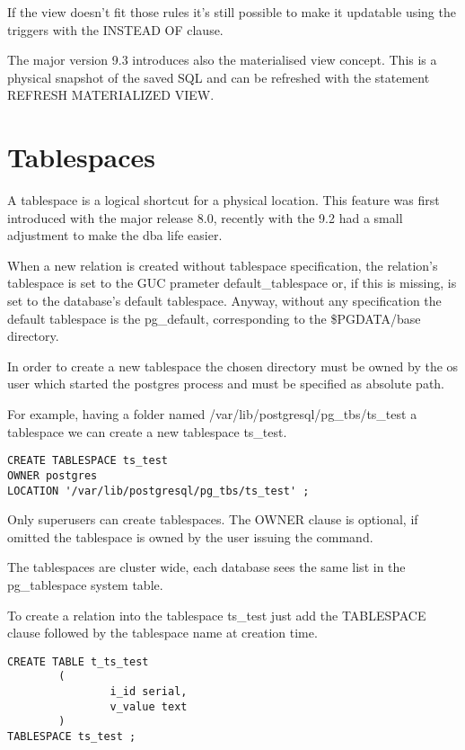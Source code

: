 If the view doesn't fit those rules it's still possible to make it updatable 
using the triggers with the INSTEAD OF clause.

The major version 9.3 introduces also the materialised view concept. This is a 
physical snapshot of the saved SQL and can be refreshed with the statement 
REFRESH MATERIALIZED VIEW.  


\section{Tablespaces}
\label{sub:TBS-LOGICAL}
A tablespace is a logical shortcut for a physical location. 
This feature was first introduced with the major release 8.0, recently with the 
9.2 had a small adjustment to make the dba life easier.

When a new relation is created without tablespace specification, the relation's
tablespace is set to the GUC prameter default\_tablespace or, if this is 
missing, is set to the database's default tablespace. 
Anyway, without any specification the default tablespace is the pg\_default, 
corresponding to the \$PGDATA/base directory.

In order to create a new tablespace the chosen directory must be owned by 
the os user which started the postgres process and must be specified as 
absolute path. 

For example, having a folder named /var/lib/postgresql/pg\_tbs/ts\_test a 
tablespace we can create a new tablespace ts\_test.

\begin{verbatim}
CREATE TABLESPACE ts_test 
OWNER postgres
LOCATION '/var/lib/postgresql/pg_tbs/ts_test' ;

\end{verbatim}

Only superusers can create tablespaces. The OWNER clause is optional, if 
omitted the tablespace is owned by the user issuing the command.

The tablespaces are cluster wide, each database sees the same list in the 
pg\_tablespace system table.

To create a relation into the tablespace ts\_test just add the TABLESPACE 
clause followed by the tablespace name at creation 
time.

\begin{verbatim}
CREATE TABLE t_ts_test
        (
                i_id serial,
                v_value text
        )
TABLESPACE ts_test ;

\end{verbatim}

